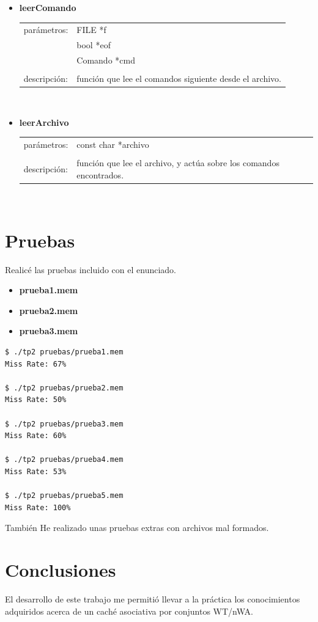 \documentclass[a4paper]{article}
\begin{document}
\begin{itemize}
\item \textbf{leerComando}\\
	\begin{tabular}{l p{12cm}}
    parámetros:    &FILE *f\\
                   &bool *eof\\
                   &Comando *cmd\\
	&\\
    descripción: &función que lee el comandos siguiente desde el archivo.
    \end{tabular}\\

\item \textbf{leerArchivo}\\
	\begin{tabular}{l p{12cm}}
    parámetros:    &const char *archivo \\
	&\\
    descripción: &función que lee el archivo, y actúa sobre los comandos encontrados.
    \end{tabular}\\

\end{itemize}
\lstset{basicstyle=\footnotesize\ttfamily}

\section{Pruebas}
Realicé las pruebas incluido con el enunciado. 
\begin{itemize}
\item \textbf{prueba1.mem}
\item \textbf{prueba2.mem}
\item \textbf{prueba3.mem}
\end{itemize}

\begin{verbatim}
$ ./tp2 pruebas/prueba1.mem
Miss Rate: 67%

$ ./tp2 pruebas/prueba2.mem
Miss Rate: 50%

$ ./tp2 pruebas/prueba3.mem
Miss Rate: 60%

$ ./tp2 pruebas/prueba4.mem
Miss Rate: 53%

$ ./tp2 pruebas/prueba5.mem
Miss Rate: 100%
\end{verbatim}

También He realizado unas pruebas extras con archivos mal formados.

\section{Conclusiones}
	El desarrollo de este trabajo me permitió llevar a la práctica los conocimientos adquiridos acerca de un caché asociativa por conjuntos WT/nWA.
\end{document}
